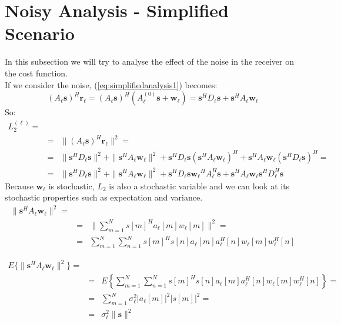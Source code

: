 \documentclass[10pt,a4paper]{report}
\begin{document}
\section{Noisy Analysis - Simplified Scenario}
In this subsection we will try to analyse the effect of the noise in the receiver on the
cost function.
\\
If we consider the noise, (\ref{eq:simplifiedanalysis1}) becomes:
\begin{equation}
(A_\ell\mathbf{s})^H\mathbf{r_\ell}=(A_\ell\mathbf{s})^H(A^{(0)}_\ell \mathbf{s}+\mathbf{w_\ell})=\mathbf{s}^H D_\ell \mathbf{s}+ \mathbf{s}^H A_\ell \mathbf{w_\ell}
\end{equation}
So:
\begin{eqnarray}
L_2^{(\ell)}= \\
&=& \|(A_\ell\mathbf{s})^H\mathbf{r_\ell}\|^2 = \nonumber\\ 
&=&\|\mathbf{s}^H D_\ell \mathbf{s}\|^2+\|\mathbf{s}^H A_\ell \mathbf{w_\ell}\|^2 + \mathbf{s}^H D_\ell \mathbf{s}(\mathbf{s}^H A_\ell \mathbf{w_\ell})^H + \mathbf{s}^H A_\ell \mathbf{w_\ell}(\mathbf{s}^H D_\ell \mathbf{s})^H = 
\nonumber \\ 
&=& \|\mathbf{s}^H D_\ell \mathbf{s}\|^2+\|\mathbf{s}^H A_\ell \mathbf{w_\ell}\|^2 + \mathbf{s}^H D_\ell \mathbf{s}\mathbf{w_\ell}^H A_\ell^H \mathbf{s} + \mathbf{s}^H A_\ell \mathbf{w_\ell}\mathbf{s}^H D_\ell^H \mathbf{s} \nonumber
\end{eqnarray}
Because $\mathbf{w_\ell}$ is stochastic, $L_2$ is also a stochastic variable and we can look at its
stochastic properties such as expectation and variance.
\begin{eqnarray}
\|\mathbf{s}^H A_\ell \mathbf{w_\ell}\|^2 = \\
&=& \| \sum_{m=1}^N{s[m]^H a_\ell[m] w_\ell[m]}\|^2 = \nonumber \\
&=&\sum_{m=1}^N\sum_{n=1}^N s[m]^H s[n] a_\ell[m] a_\ell^H[n] w_\ell[m] w_\ell^H[n] \nonumber
\end{eqnarray}

\begin{eqnarray}
E\{\|\mathbf{s}^H A_\ell \mathbf{w_\ell}\|^2\}= \\
&=& E\left\{\sum_{m=1}^N\sum_{n=1}^N s[m]^H s[n] a_\ell[m] a_\ell^H[n] w_\ell[m] w_\ell^H[n]\right\}= \nonumber \\
&=& \sum_{m=1}^N \sigma_\ell^2 |a_\ell[m]|^2 |s[m]|^2 = \nonumber \\
&=& \sigma_\ell^2 \|\mathbf{s}\|^2 \nonumber
\end{eqnarray}
\end{document}
